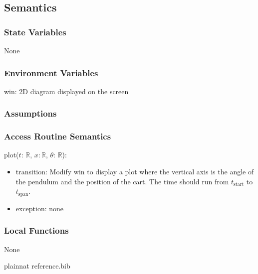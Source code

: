 \documentclass[12pt, titlepage]{article}
\begin{document}
\subsection{Semantics}

\subsubsection{State Variables}
None
\subsubsection{Environment Variables}
win: 2D diagram displayed on the screen
\subsubsection{Assumptions}


\subsubsection{Access Routine Semantics}

\noindent  plot($t$: $\mathbb{R}$, $x$$: \mathbb{R}$, $\theta$: $\mathbb{R}$):
\begin{itemize}
\item transition: Modify win to display a plot where the vertical axis
  is the angle of the pendulum and the position of the cart.  The time should run from $t_\text{start}$ to $t_\text{span}$.
\item exception: none
\end{itemize}


\subsubsection{Local Functions}
None
\newpage



 {plainnat}
 {reference.bib}

\newpage
\end{document}
